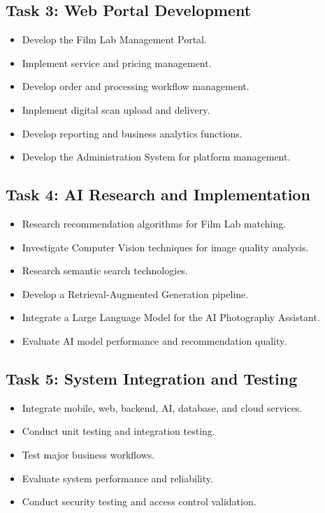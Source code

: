 \subsection{Task 3: Web Portal Development}

\begin{itemize}
    \item Develop the Film Lab Management Portal.
    \item Implement service and pricing management.
    \item Develop order and processing workflow management.
    \item Implement digital scan upload and delivery.
    \item Develop reporting and business analytics functions.
    \item Develop the Administration System for platform management.
\end{itemize}

\subsection{Task 4: AI Research and Implementation}

\begin{itemize}
    \item Research recommendation algorithms for Film Lab matching.
    \item Investigate Computer Vision techniques for image quality analysis.
    \item Research semantic search technologies.
    \item Develop a Retrieval-Augmented Generation pipeline.
    \item Integrate a Large Language Model for the AI Photography Assistant.
    \item Evaluate AI model performance and recommendation quality.
\end{itemize}

\subsection{Task 5: System Integration and Testing}

\begin{itemize}
    \item Integrate mobile, web, backend, AI, database, and cloud services.
    \item Conduct unit testing and integration testing.
    \item Test major business workflows.
    \item Evaluate system performance and reliability.
    \item Conduct security testing and access control validation.
\end{itemize}


